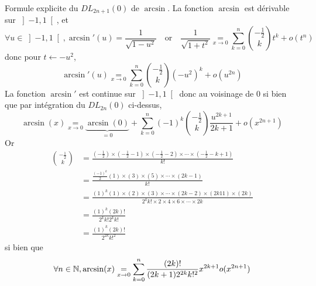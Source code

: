 \documentclass{article}
\begin{document}
\begin{question_kholle}{Formule explicite du $DL_{2n+1}(0)$ de $\arcsin$.}
	La fonction $\arcsin$ est dérivable sur $\left]-1, 1\right[$, et
			\[
			\forall u\in\left]-1,1\right[, \arcsin'(u) = \frac{1}{\sqrt{1-u^{2}}} \quad\text{or}\quad \frac{1}{\sqrt{1+t^{2}}}\underset{x\to 0}{=} \sum_{k=0}^{n}\binom{-\frac{1}{2}}{k}t^{k} +o(t^{n})
		\]
		donc pour $t\leftarrow -u^{2}$,
		\[
			\arcsin '(u) \underset{x\to 0}{=}\sum_{k=0}^{n}\binom{-\frac{1}{2}}{k}(-u^{2})^{k}+o(u^{2n})
		\]
		La fonction $\arcsin'$ est continue sur $\left]-1, 1\right[$ donc au voisinage de 0 si bien que par intégration du $DL_{2n}(0)$ ci-dessus,
	\[
		\arcsin(x) \underset{x\to 0}{=} \underbrace{\arcsin(0)}_{=0} + \sum_{k=0}^{n}(-1)^{k}\binom{-\frac{1}{2}}{k}\frac{u^{2k+1}}{2k+1} + o(x^{2n+1})
	\]
	Or
	\begin{align*}
		\binom{-\frac{1}{2}}{k} & =\frac{\left(-\frac{1}{2}\right)\times \left(-\frac{1}{2}-1\right)\times \left(-\frac{1}{2}-2\right)\times \cdots \times \left(-\frac{1}{2}-k+1\right)}{k!} \\
		                        & =\frac{\frac{(-1)^{k}}{2}(1)\times (3)\times (5)\times \cdots \times (2k-1)}{k!}                                                                            \\
		                        & = \frac{(1)^{k} (1)\times (2)\times (3)\times \cdots \times (2k-2) \times (2k11)\times (2k)}{2^{k}k! \times 2 \times 4 \times 6 \times \cdots \times 2k}    \\
		                        & = \frac{(1)^{k}(2k)!}{2^{k}k!2^{k}k!}                                                                                                                       \\
		                        & = \frac{(1)^{k}(2k)!}{2^{2k}k!^{2}}
	\end{align*}
	si bien que
	\[
		\forall n\in\mathbb N, \arcsin(x) \underset{x\to 0}{=}\sum_{k=0}^{n}\frac{(2k)!}{(2k+1)2^{2k}k!^{2}}x^{2k+1}o(x^{2n+1})
	\]
\end{question_kholle}
\end{document}
